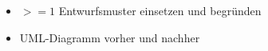 \begin{itemize}
	\item $>= 1$ Entwurfsmuster einsetzen und begründen

	\item UML-Diagramm vorher und nachher
\end{itemize}
